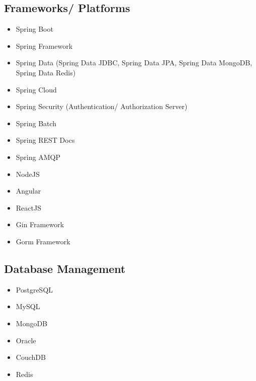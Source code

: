 \begin{cventries}
\begin{row}[cellsep=0.75cm]{3}{3}
    \begin{cell}{1}
	\section*{Frameworks/ Platforms}
	\vspace{-1.5ex}
    \begin{itemize}
        \item {Spring Boot}
        \item {Spring Framework}
        \item {Spring Data (Spring Data JDBC, Spring Data JPA, Spring Data MongoDB, Spring Data Redis)}
        \item {Spring Cloud}
        \item {Spring Security (Authentication/ Authorization Server)}
        \item {Spring Batch}
        \item {Spring REST Docs}
        \item {Spring AMQP}
        \item {NodeJS}
        \item {Angular}
        \item {ReactJS}
        \item {Gin Framework}
        \item {Gorm Framework}
    \end{itemize}
	\end{cell}
    \begin{cell}{1}
	\section*{Database Management}
	\vspace{-1.5ex}
    \begin{itemize}
        \item {PostgreSQL}
        \item {MySQL}
        \item {MongoDB}
        \item {Oracle}
        \item {CouchDB}
        \item {Redis}
    \end{itemize}
	\end{cell}
	\begin{cell}{1}

\end{cell}
\end{row}
\end{cventries}
